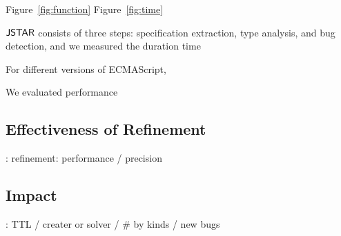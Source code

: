 Figure~\ref{fig:function}
Figure~\ref{fig:time}

$\tool$ consists of three steps:
specification extraction, type analysis, and bug detection, and we measured the
duration time 


For different  versions of ECMAScript, 

We evaluated performance 


\subsection{Effectiveness of Refinement}

\todo: refinement: performance / precision


\subsection{Impact}

\todo: TTL / creater or solver / \# by kinds / new bugs
